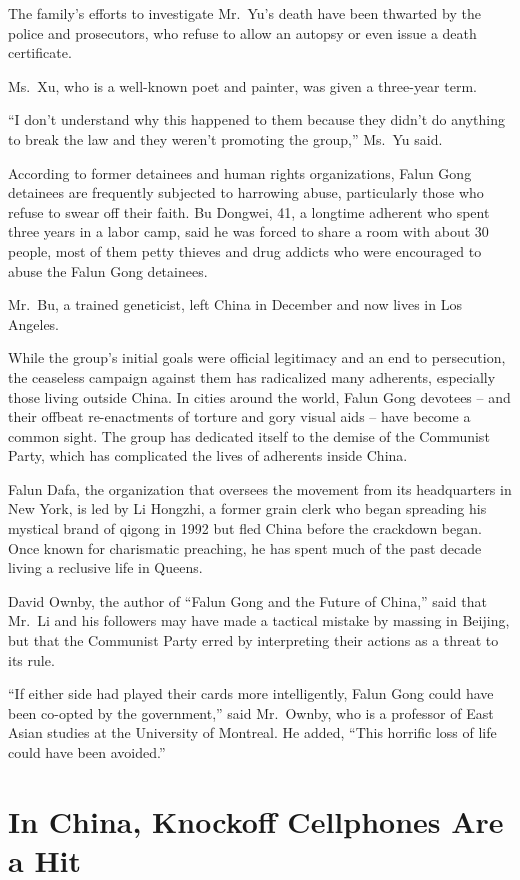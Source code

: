 \documentclass[12pt,a4paper,onecolumn]{article}
\begin{document}
The family's efforts to investigate Mr.~Yu's death have been thwarted by the police and prosecutors,
who refuse to allow an autopsy or even issue a death certificate.

Ms.~Xu, who is a well-known poet and painter, was given a three-year term.

``I don't understand why this happened to them because they didn't do anything to break the law and
they weren't promoting the group,'' Ms.~Yu said.

According to former detainees and human rights organizations, Falun Gong detainees are frequently
subjected to harrowing abuse, particularly those who refuse to swear off their faith. Bu Dongwei,
41, a longtime adherent who spent three years in a labor camp, said he was forced to share a room
with about 30 people, most of them petty thieves and drug addicts who were encouraged to abuse the
Falun Gong detainees.

Mr.~Bu, a trained geneticist, left China in December and now lives in Los Angeles.

While the group's initial goals were official legitimacy and an end to persecution, the ceaseless
campaign against them has radicalized many adherents, especially those living outside China. In
cities around the world, Falun Gong devotees -- and their offbeat re-enactments of torture and gory
visual aids -- have become a common sight. The group has dedicated itself to the demise of the
Communist Party, which has complicated the lives of adherents inside China.

Falun Dafa, the organization that oversees the movement from its headquarters in New York, is led by
Li Hongzhi, a former grain clerk who began spreading his mystical brand of qigong in 1992 but fled
China before the crackdown began. Once known for charismatic preaching, he has spent much of the
past decade living a reclusive life in Queens.

David Ownby, the author of ``Falun Gong and the Future of China,'' said that Mr.~Li and his
followers may have made a tactical mistake by massing in Beijing, but that the Communist Party erred
by interpreting their actions as a threat to its rule.

``If either side had played their cards more intelligently, Falun Gong could have been co-opted by
the government,'' said Mr.~Ownby, who is a professor of East Asian studies at the University of
Montreal. He added, ``This horrific loss of life could have been avoided.''

\section{In China, Knockoff Cellphones Are a Hit}
\end{document}
